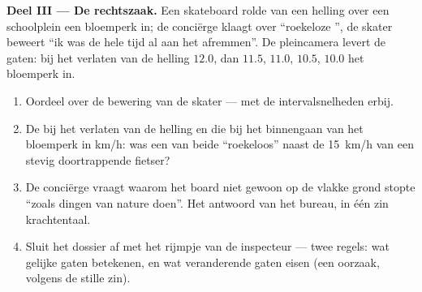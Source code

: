 \begin{problem}
\medskip\noindent\textbf{Deel III --- De rechtszaak.}
Een skateboard rolde van een helling over een schoolplein een
bloemperk in; de conciërge klaagt over ``roekeloze
'', de skater beweert ``ik was de hele tijd al aan het
afremmen''. De pleincamera levert de gaten: bij het verlaten van de
helling $12.0$, dan $11.5$, $11.0$, $10.5$, $10.0$ het bloemperk in.
\begin{enumerate}[resume]
  \item Oordeel over de bewering van de skater --- met de
        intervalsnelheden erbij.
  \item De  bij het verlaten van de helling en die bij
        het binnengaan van het bloemperk in \unit{km/h}: was een van
        beide ``roekeloos'' naast de \qty{15}{km/h} van een stevig
        doortrappende fietser?
  \item De conciërge vraagt waarom het board niet gewoon op de vlakke
        grond stopte ``zoals dingen van nature doen''. Het antwoord
        van het bureau, in één zin krachtentaal.
  \item Sluit het dossier af met het rijmpje van de inspecteur --- twee
        regels: wat gelijke gaten betekenen, en wat veranderende gaten
        eisen (een oorzaak, volgens de stille zin).
\end{enumerate}
\end{problem}
